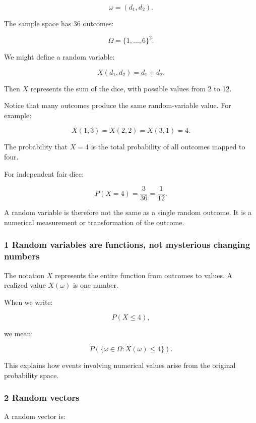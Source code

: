 \[
 \omega=(d_1,d_2).
\]

The sample space has 36 outcomes:

\[
 \Omega=\{1,\ldots,6\}^2.
\]

We might define a random variable:

\[
 X(d_1,d_2)=d_1+d_2.
\]

Then \(X\) represents the sum of the dice, with possible values from 2 to 12.

Notice that many outcomes produce the same random-variable value. For example:

\[
 X(1,3)=X(2,2)=X(3,1)=4.
\]

The probability that \(X=4\) is the total probability of all outcomes mapped to four.

For independent fair dice:

\[
 P(X=4)=\frac3{36}=\frac1{12}.
\]

A random variable is therefore not the same as a single random outcome. It is a numerical measurement or transformation of the outcome.

\subsubsection{1 Random variables are functions, not mysterious changing numbers}\label{02-foundations-ii-ch023-random-variables-are-functions-not-mysterious-changing-numbers}

\hypertarget{02-foundations-ii-ch023-random-variables-are-functions-not-mysterious-changing-numbers}{}

The notation \(X\) represents the entire function from outcomes to values. A realized value \(X(\omega)\) is one number.

When we write:

\[
 P(X\le4),
\]

we mean:

\[
 P(\{\omega\in\Omega:X(\omega)\le4\}).
\]

This explains how events involving numerical values arise from the original probability space.

\subsubsection{2 Random vectors}\label{02-foundations-ii-ch023-random-vectors}

\hypertarget{02-foundations-ii-ch023-random-vectors}{}

A random vector is:

